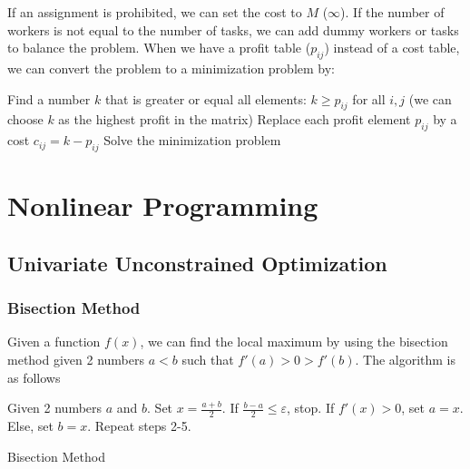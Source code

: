 \documentclass{report}
\begin{document}
\begin{description}
	 If an assignment is prohibited, we can set the cost to $M$ ($\infty$).
	 If the number of workers is not equal to the number of tasks, we can add dummy workers or tasks to balance the problem.
	\ii[Maximization] When we have a profit table ($p_{ij}$) instead of a cost table, we can convert the problem to a minimization problem by:
	\begin{enumerate}
		\ii Find a number $k$ that is greater or equal all elements: $k \geq p_{ij}$ for all $i, j$ (we can choose $k$ as the highest profit in the matrix)
		\ii Replace each profit element $p_{ij}$ by a cost $c_{ij} = k - p_{ij}$
		\ii Solve the minimization problem
	\end{enumerate}
\end{description}

\chapter{Nonlinear Programming}


\section{Univariate Unconstrained Optimization}

\subsection{Bisection Method}

Given a function $f(x)$, we can find the local maximum by using the bisection method given 2 numbers $a<b$ such that $f'(a)>0>f'(b)$. The algorithm is as follows

\begin{enumerate}
	\ii Given 2 numbers $a$ and $b$.
	\ii Set $x=\frac{a+b}{2}$.
	\ii If $\frac{b-a}{2} \leq \varepsilon$, stop.
	\ii If $f'(x)>0$, set $a=x$.
	\ii Else, set $b=x$.
	\ii Repeat steps 2-5.
\end{enumerate}

\begin{algorithm}
	\SetAlgoLined
	\caption{Bisection Method}
\end{algorithm}
\end{document}
